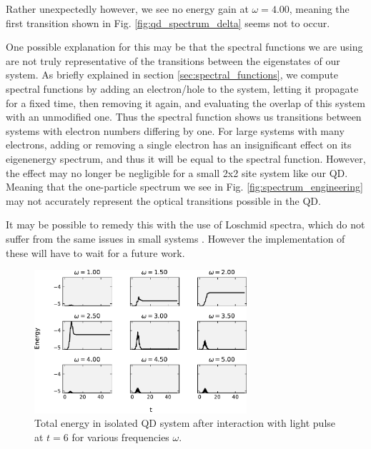 \medskip

Rather unexpectedly however, we see no energy gain at $\omega = 4.00$, meaning the first transition shown in Fig. \ref{fig:qd_spectrum_delta} seems not to occur.

\medskip

One possible explanation for this may be that the spectral functions we are using are not truly representative of the transitions between the eigenstates of our system. As briefly explained in section \ref{sec:spectral_functions}, we compute spectral functions by adding an electron/hole to the system, letting it propagate for a fixed time, then removing it again, and evaluating the overlap of this system with an unmodified one. Thus the spectral function shows us transitions between systems with electron numbers differing by one. For large systems with many electrons, adding or removing a single electron has an insignificant effect on its eigenenergy spectrum, and thus it will be equal to the spectral function. However, the effect may no longer be negligible for a small 2x2 site system like our QD. Meaning that the one-particle spectrum we see in Fig. \ref{fig:spectrum_engineering} may not accurately represent the optical transitions possible in the QD.

\medskip
It may be possible to remedy this with the use of Loschmid spectra, which do not suffer from the same issues in small systems \cite{loschmidt}. However the implementation of these will have to wait for a future work. 

\medskip

\begin{figure}[!hbt]
    \centering
    \includegraphics[width=0.7\textwidth]{graph/isolated_QD_freqsweep.pdf}
    \caption{Total energy in isolated QD system after interaction with light pulse at $t=6$ for various frequencies $\omega$.}
    \label{fig:qd_9_total_energy}
\end{figure}